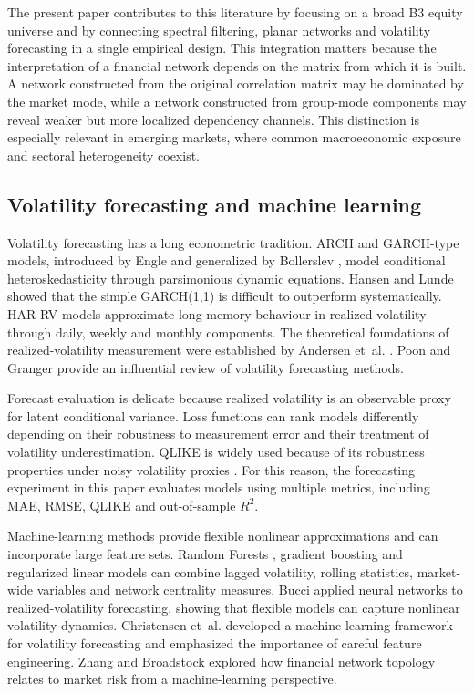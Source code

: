 The present paper contributes to this literature by focusing on a broad B3 equity universe and by connecting spectral filtering, planar networks and volatility forecasting in a single empirical design. This integration matters because the interpretation of a financial network depends on the matrix from which it is built. A network constructed from the original correlation matrix may be dominated by the market mode, while a network constructed from group-mode components may reveal weaker but more localized dependency channels. This distinction is especially relevant in emerging markets, where common macroeconomic exposure and sectoral heterogeneity coexist.

\subsection{Volatility forecasting and machine learning}

Volatility forecasting has a long econometric tradition. ARCH and GARCH-type models, introduced by Engle \cite{engle_1982_autoregressive} and generalized by Bollerslev \cite{bollerslev_1986_generalized}, model conditional heteroskedasticity through parsimonious dynamic equations. Hansen and Lunde \cite{hansen_lunde_2005} showed that the simple GARCH(1,1) is difficult to outperform systematically. HAR-RV models \cite{corsi_2009_simple} approximate long-memory behaviour in realized volatility through daily, weekly and monthly components. The theoretical foundations of realized-volatility measurement were established by Andersen et~al. \cite{andersen_2003_modeling}. Poon and Granger \cite{poon_granger_2003} provide an influential review of volatility forecasting methods.

Forecast evaluation is delicate because realized volatility is an observable proxy for latent conditional variance. Loss functions can rank models differently depending on their robustness to measurement error and their treatment of volatility underestimation. QLIKE is widely used because of its robustness properties under noisy volatility proxies \cite{patton_2011_volatility}. For this reason, the forecasting experiment in this paper evaluates models using multiple metrics, including MAE, RMSE, QLIKE and out-of-sample $R^2$.

Machine-learning methods provide flexible nonlinear approximations and can incorporate large feature sets. Random Forests \cite{breiman_2001_random}, gradient boosting \cite{friedman_2001_greedy} and regularized linear models \cite{hoerl_kennard_1970_ridge} can combine lagged volatility, rolling statistics, market-wide variables and network centrality measures. Bucci \cite{bucci_2020_realized} applied neural networks to realized-volatility forecasting, showing that flexible models can capture nonlinear volatility dynamics. Christensen et~al. \cite{christensen_2022_realized} developed a machine-learning framework for volatility forecasting and emphasized the importance of careful feature engineering. Zhang and Broadstock \cite{zhang_2023_network_volatility} explored how financial network topology relates to market risk from a machine-learning perspective.

